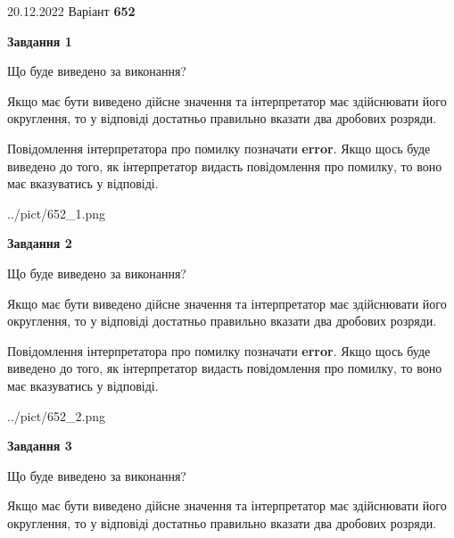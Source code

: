 \documentclass[12pt, ukrainian]{article}
\begin{document}
{20.12.2022 Варіант \No \textbf { 652 }\par}
{
\begin {Large}

{\begin {center}\textbf{Завдання 1}\end {center}}\par
Що буде виведено за виконання? \par

Якщо має бути виведено дійсне значення та інтерпретатор має здійснювати його округлення, 
то у відповіді достатньо правильно вказати два дробових розряди.

Повідомлення інтерпретатора про помилку позначати \textbf{error}.
Якщо щось буде виведено до того, як інтерпретатор видасть повідомлення про помилку, 
то воно має вказуватись у відповіді. \par

\begin{center}
	{../pict/652_1.png}
\end{center}
\newpage

{\begin {center}\textbf{Завдання 2}\end {center}}\par
Що буде виведено за виконання? \par

Якщо має бути виведено дійсне значення та інтерпретатор має здійснювати його округлення, 
то у відповіді достатньо правильно вказати два дробових розряди.

Повідомлення інтерпретатора про помилку позначати \textbf{error}.
Якщо щось буде виведено до того, як інтерпретатор видасть повідомлення про помилку, 
то воно має вказуватись у відповіді. \par

\begin{center}
	{../pict/652_2.png}
\end{center}
\newpage

{\begin {center}\textbf{Завдання 3}\end {center}}\par
Що буде виведено за виконання? \par

Якщо має бути виведено дійсне значення та інтерпретатор має здійснювати його округлення, 
то у відповіді достатньо правильно вказати два дробових розряди.


\end{Large}}
\end{document}
